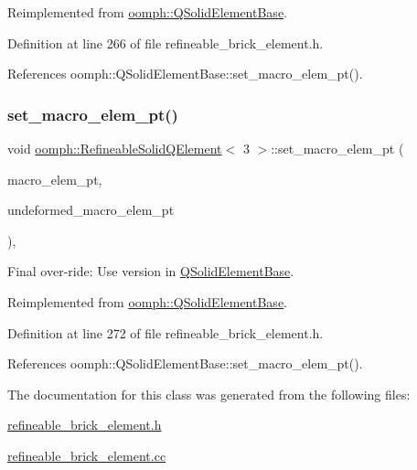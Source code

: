 Reimplemented from \hyperlink{classoomph_1_1QSolidElementBase_a0ceca47c039bbb38b0feb3baa330a27f}{oomph\+::\+Q\+Solid\+Element\+Base}.



Definition at line 266 of file refineable\+\_\+brick\+\_\+element.\+h.



References oomph\+::\+Q\+Solid\+Element\+Base\+::set\+\_\+macro\+\_\+elem\+\_\+pt().

\mbox{\label{classoomph_1_1RefineableSolidQElement_3_013_01_4_ab2c2950454d7c4ea16a597192c7fae15}} 
\subsubsection{\texorpdfstring{set\+\_\+macro\+\_\+elem\+\_\+pt()}{set\_macro\_elem\_pt()}\hspace{0.1cm}{\footnotesize\ttfamily [2/2]}}
{\footnotesize\ttfamily void \hyperlink{classoomph_1_1RefineableSolidQElement}{oomph\+::\+Refineable\+Solid\+Q\+Element}$<$ 3 $>$\+::set\+\_\+macro\+\_\+elem\+\_\+pt (\begin{DoxyParamCaption}\item[{\hyperlink{classoomph_1_1MacroElement}{Macro\+Element} $\ast$}]{macro\+\_\+elem\+\_\+pt,  }\item[{\hyperlink{classoomph_1_1MacroElement}{Macro\+Element} $\ast$}]{undeformed\+\_\+macro\+\_\+elem\+\_\+pt }\end{DoxyParamCaption})\hspace{0.3cm}{\ttfamily [inline]}, {\ttfamily [virtual]}}



Final over-\/ride\+: Use version in \hyperlink{classoomph_1_1QSolidElementBase}{Q\+Solid\+Element\+Base}. 



Reimplemented from \hyperlink{classoomph_1_1QSolidElementBase_aa7f14a039224fb4c513da587448d2c3b}{oomph\+::\+Q\+Solid\+Element\+Base}.



Definition at line 272 of file refineable\+\_\+brick\+\_\+element.\+h.



References oomph\+::\+Q\+Solid\+Element\+Base\+::set\+\_\+macro\+\_\+elem\+\_\+pt().



The documentation for this class was generated from the following files\+:\begin{DoxyCompactItemize}
\item 
\hyperlink{refineable__brick__element_8h}{refineable\+\_\+brick\+\_\+element.\+h}\item 
\hyperlink{refineable__brick__element_8cc}{refineable\+\_\+brick\+\_\+element.\+cc}\end{DoxyCompactItemize}
